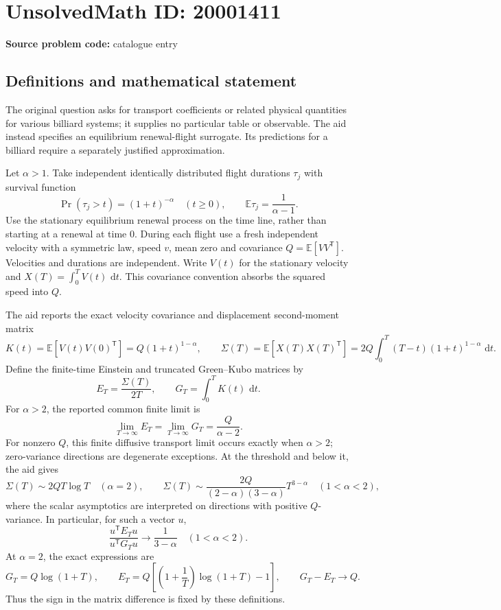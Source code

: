 \documentclass[11pt]{article}
\newcommand{\E}{\mathbb{E}}
\newcommand{\dd}{\,\mathrm{d}}
\begin{document}
\section*{UnsolvedMath ID: 20001411}
\textbf{Source problem code:} catalogue entry
\subsection{Definitions and mathematical statement}
The original question asks for transport coefficients or related physical quantities for various billiard systems; it supplies no particular table or observable. The aid instead specifies an equilibrium renewal-flight surrogate. Its predictions for a billiard require a separately justified approximation.

Let \(\alpha>1\). Take independent identically distributed flight durations \(\tau_j\) with survival function
\[
 \Pr(\tau_j>t)=(1+t)^{-\alpha}\quad(t\geq0),\qquad
 \E\tau_j=\frac1{\alpha-1}.
\]
Use the stationary equilibrium renewal process on the time line, rather than starting at a renewal at time \(0\). During each flight use a fresh independent velocity with a symmetric law, speed \(v\), mean zero and covariance \(Q=\E[V V^{\mathsf T}]\). Velocities and durations are independent. Write \(V(t)\) for the stationary velocity and \(X(T)=\int_0^T V(t)\,\dd t\). This covariance convention absorbs the squared speed into \(Q\).

The aid reports the exact velocity covariance and displacement second-moment matrix
\[
 K(t)=\E[V(t)V(0)^{\mathsf T}]=Q(1+t)^{1-\alpha},\qquad
 \Sigma(T)=\E[X(T)X(T)^{\mathsf T}]
 =2Q\int_0^T(T-t)(1+t)^{1-\alpha}\,\dd t.
\]
Define the finite-time Einstein and truncated Green--Kubo matrices by
\[
 E_T=\frac{\Sigma(T)}{2T},\qquad
 G_T=\int_0^T K(t)\,\dd t.
\]
For \(\alpha>2\), the reported common finite limit is
\[
 \lim_{T\to\infty}E_T=\lim_{T\to\infty}G_T=\frac{Q}{\alpha-2}.
\]
For nonzero \(Q\), this finite diffusive transport limit occurs exactly when \(\alpha>2\); zero-variance directions are degenerate exceptions. At the threshold and below it, the aid gives
\[
 \Sigma(T)\sim2QT\log T\quad(\alpha=2),\qquad
 \Sigma(T)\sim\frac{2Q}{(2-\alpha)(3-\alpha)}T^{3-\alpha}
 \quad(1<\alpha<2),
\]
where the scalar asymptotics are interpreted on directions with positive \(Q\)-variance. In particular, for such a vector \(u\),
\[
 \frac{u^{\mathsf T}E_Tu}{u^{\mathsf T}G_Tu}\longrightarrow\frac1{3-\alpha}
 \quad(1<\alpha<2).
\]
At \(\alpha=2\), the exact expressions are
\[
 G_T=Q\log(1+T),\qquad
 E_T=Q\left[\left(1+\frac1T\right)\log(1+T)-1\right],
 \qquad G_T-E_T\longrightarrow Q.
\]
Thus the sign in the matrix difference is fixed by these definitions.
\end{document}
